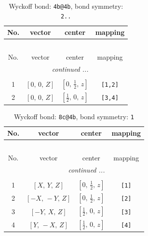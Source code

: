 \documentclass[fleqn,8pt]{jsarticle}
\begin{document}
\renewcommand{\arraystretch}{1.2}
\begin{longtable}{cccc}
\caption{Wyckoff bond: {\tt 4b@4b}, bond symmetry: {\tt 2..}}
 \\
 \hline \hline
No. & vector & center & mapping \\ \hline \endfirsthead

\multicolumn{3}{l}{\tablename\ \thetable{}} \\
 \hline \hline
No. & vector & center & mapping \\ \hline \endhead

 \hline \hline
\multicolumn{3}{r}{\footnotesize\it continued ...} \\ \endfoot

 \hline \hline
\multicolumn{3}{r}{} \\ \endlastfoot

1 & $\left[ 0,\, 0,\, Z \right]$ & $\left[ 0,\, \frac{1}{2},\, z \right]$ & {\tt [1,2]} \\ \hline
2 & $\left[ 0,\, 0,\, Z \right]$ & $\left[ \frac{1}{2},\, 0,\, z \right]$ & {\tt [3,4]} \\
\end{longtable}
\renewcommand{\arraystretch}{1.2}
\begin{longtable}{cccc}
\caption{Wyckoff bond: {\tt 8c@4b}, bond symmetry: {\tt 1}}
 \\
 \hline \hline
No. & vector & center & mapping \\ \hline \endfirsthead

\multicolumn{3}{l}{\tablename\ \thetable{}} \\
 \hline \hline
No. & vector & center & mapping \\ \hline \endhead

 \hline \hline
\multicolumn{3}{r}{\footnotesize\it continued ...} \\ \endfoot

 \hline \hline
\multicolumn{3}{r}{} \\ \endlastfoot

1 & $\left[ X,\, Y,\, Z \right]$ & $\left[ 0,\, \frac{1}{2},\, z \right]$ & {\tt [1]} \\ \hline
2 & $\left[ - X,\, - Y,\, Z \right]$ & $\left[ 0,\, \frac{1}{2},\, z \right]$ & {\tt [2]} \\ \hline
3 & $\left[ - Y,\, X,\, Z \right]$ & $\left[ \frac{1}{2},\, 0,\, z \right]$ & {\tt [3]} \\ \hline
4 & $\left[ Y,\, - X,\, Z \right]$ & $\left[ \frac{1}{2},\, 0,\, z \right]$ & {\tt [4]} \\
\end{longtable}
\end{document}
